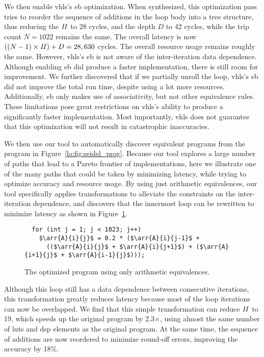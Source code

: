 We then enable \gls{vhls}'s \gls{eb} optimization.  When synthesized, this
optimization pass tries to reorder the sequence of additions in the loop body
into a tree structure, thus reducing the $\mathit{II}$ to 28 cycles, and the depth $D$
to 42 cycles, while the trip count $N = 1022$ remains the same.  The overall
latency is now $((N-1) \times \mathit{II}) + D = 28,630$ cycles.  The overall resource
usage remains roughly the same.  However, \gls{vhls}'s \gls{eb} is not aware of
the inter-iteration data dependence.  Although enabling \gls{eb} did produce
a faster implementation, there is still room for improvement.  We further
discovered that if we partially unroll the loop, \gls{vhls}'s \gls{eb} did not
improve the total run time, despite using a lot more resources.  Additionally,
\gls{eb} only makes use of associativity, but not other equivalence rules.
These limitations pose great restrictions on \gls{vhls}'s ability to produce
a significantly faster implementation.  Most importantly, \gls{vhls} does not
guarantee that this optimization will not result in catastrophic inaccuracies.

We then use our tool to automatically discover equivalent programs from the
program in Figure~\ref{lo:fig:seidel_prog}.  Because our tool explores a
large number of paths that lead to a Pareto frontier of implementations,
here we illustrate one of the many paths that could be taken by minimizing
latency, while trying to optimize accuracy and resource usage.  By using just
arithmetic equivalences, our tool specifically applies transformations to
alleviate the constraints on the inter-iteration dependence, and discovers
that the innermost loop can be rewritten to minimize latency as shown in
Figure~\ref{lo:fig:seidel_prog_2}.

\begin{figure}[ht]
\begin{lstlisting}
  for (int j = 1; j < 1023; j++)
    $\arr{A}{i}{j}$ = 0.2 * ($\arr{A}{i}{j-1}$ +
      (($\arr{A}{i}{j}$ + $\arr{A}{i}{j+1}$) + ($\arr{A}{i+1}{j}$ + $\arr{A}{i-1}{j}$)));
\end{lstlisting}
    \caption{The optimized program using only arithmetic equivalences.}
    \label{lo:fig:seidel_prog_2}
\end{figure}

Although this loop still has a data dependence between consecutive iterations,
this transformation greatly reduces latency because most of the loop iterations
can now be overlapped.  We find that this simple transformation can reduce
$\mathit{II}$ to 19, which speeds up the original program by 2.3$\times$, using almost
the same number of \glspl{lut} and \gls{dsp} elements as the original program.
At the same time, the sequence of additions are now reordered to minimize
round-off errors, improving the accuracy by 18\%.

